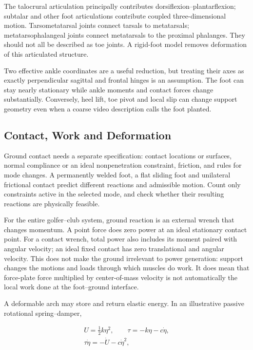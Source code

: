 The talocrural articulation principally contributes dorsiflexion--plantarflexion; subtalar and other foot articulations contribute coupled three-dimensional motion. Tarsometatarsal joints connect tarsals to metatarsals; metatarsophalangeal joints connect metatarsals to the proximal phalanges. They should not all be described as toe joints. A rigid-foot model removes deformation of this articulated structure.

Two effective ankle coordinates are a useful reduction, but treating their axes as exactly perpendicular sagittal and frontal hinges is an assumption. The foot can stay nearly stationary while ankle moments and contact forces change substantially. Conversely, heel lift, toe pivot and local slip can change support geometry even when a coarse video description calls the foot planted.

\subsection{Contact, Work and Deformation}\label{contact-work-and-deformation}

Ground contact needs a separate specification: contact locations or surfaces, normal compliance or an ideal nonpenetration constraint, friction, and rules for mode changes. A permanently welded foot, a flat sliding foot and unilateral frictional contact predict different reactions and admissible motion. Count only constraints active in the selected mode, and check whether their resulting reactions are physically feasible.

For the entire golfer--club system, ground reaction is an external wrench that changes momentum. A point force does zero power at an ideal stationary contact point. For a contact wrench, total power also includes its moment paired with angular velocity; an ideal fixed contact has zero translational and angular velocity. This does not make the ground irrelevant to power generation: support changes the motions and loads through which muscles do work. It does mean that force-plate force multiplied by center-of-mass velocity is not automatically the local work done at the foot--ground interface.

A deformable arch may store and return elastic energy. In an illustrative passive rotational spring--damper,

\[
\begin{gathered}U=\tfrac12 k\eta^2,\qquad \tau=-k\eta-c\dot\eta,\\ \tau\dot\eta=-\dot U-c\dot\eta^2,\end{gathered}
\]

